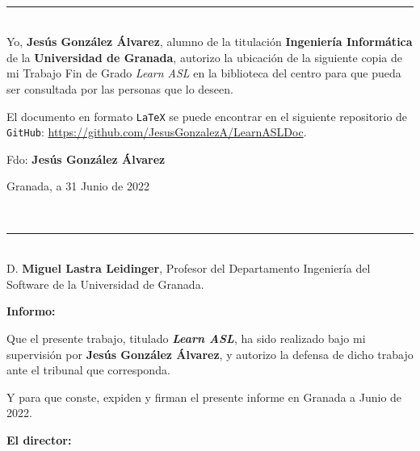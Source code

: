 \newpage
\thispagestyle{empty}
\
\vspace{3cm}

\noindent\rule[-1ex]{\textwidth}{2pt}\\[4.5ex]

Yo, \textbf{Jesús González Álvarez}, alumno de la titulación \textbf{Ingeniería Informática} de la \textbf{Universidad de Granada}, autorizo la ubicación de la siguiente copia de mi Trabajo Fin de Grado \textit{Learn ASL} en la biblioteca del centro para que pueda ser consultada por las personas que lo deseen.

\bigskip
El documento en formato {\tt LaTeX} se puede encontrar en el siguiente repositorio de {\tt GitHub}: \url{https://github.com/JesusGonzalezA/LearnASLDoc}.

\vspace{7.5cm}

\noindent Fdo: \textbf{Jesús González Álvarez}

\vspace{2cm}

\begin{flushright}
Granada, a 31 Junio de 2022
\end{flushright}

\newpage
\thispagestyle{empty}
\
\vspace{3cm}

\noindent\rule[-1ex]{\textwidth}{2pt}\\[4.5ex]

D. \textbf{Miguel Lastra Leidinger}, Profesor del Departamento Ingeniería del Software de la Universidad de Granada.


\vspace{0.5cm}

\textbf{Informo:}

\vspace{0.5cm}

Que el presente trabajo, titulado \textit{\textbf{Learn ASL}},
ha sido realizado bajo mi supervisión por \textbf{Jesús González Álvarez}, y autorizo la defensa de dicho trabajo ante el tribunal
que corresponda.

\vspace{0.5cm}

Y para que conste, expiden y firman el presente informe en Granada a Junio de 2022.

\vspace{1cm}

\textbf{El director: }

\vspace{4cm}

